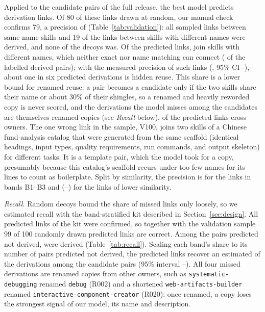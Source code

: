\documentclass[sigconf,screen]{acmart}
\begin{document}
Applied to the \ResCandPairs{} candidate pairs of the full release, the best model predicts \ResDerivedEdges{} derivation links. Of 80 of these links drawn at random, our manual check confirms 79, a precision of \ResValPrecision{} (Table~\ref{tab:validation}): all \ResValNSameName{} sampled links between same-name skills and 19 of the \ResValNDiffName{} links between skills with different names were derived, and none of the \ResValDecoys{} decoys was. Of the predicted links, \ResEdgesDiffName{} join skills with different names, which neither exact nor name matching can connect (\ResGoldDerivedDiffName{} of the labelled derived pairs); with the measured precision of such links (\ResValPrecDiffName{}, 95\% CI \ResValPrecDiffNameLo-\ResValPrecDiffNameHi), about one in six predicted derivations is hidden reuse. This share is a lower bound for renamed reuse: a pair becomes a candidate only if the two skills share their name or about 30\% of their shingles, so a renamed and heavily reworded copy is never scored, and the derivations the model misses among the candidates are themselves renamed copies (see \emph{Recall} below). \ResEdgesCrossOwner{} of the predicted links cross owners.
The one wrong link in the sample, V100, joins two skills of a Chinese fund-analysis catalog that were generated from the same scaffold (identical headings, input types, quality requirements, run commands, and output skeleton) for different tasks. It is a template pair, which the model took for a copy, presumably because this catalog's scaffold recurs under too few names for its lines to count as boilerplate. Split by similarity, the precision is \ResValPrecHiSim{} for the \ResValNHiSim{} links in bands B1--B3 and \ResValPrecLowSim{} (\ResValPrecLowSimLo--\ResValPrecLowSimHi) for the \ResValNLowSim{} links of lower similarity.

\emph{Recall.} Random decoys bound the share of missed links only loosely, so we estimated recall with the band-stratified kit described in Section~\ref{sec:design}. All \ResRCPos{} predicted links of the kit were confirmed, so together with the validation sample 99 of 100 randomly drawn predicted links are correct. Among the \ResRCNeg{} pairs predicted not derived, \ResRCNegDerived{} were derived (Table~\ref{tab:recall}). Scaling each band's share to its number of pairs predicted not derived, the predicted links recover an estimated \ResRCRecall{} of the derivations among the candidate pairs (95\% interval \ResRCRecallLo--\ResRCRecallHi). All four missed derivations are renamed copies from other owners, such as \texttt{systematic-debugging} renamed \texttt{debug} (R002) and a shortened \texttt{web-artifacts-builder} renamed \texttt{interactive-component-creator} (R020): once renamed, a copy loses the strongest signal of our model, its name and description.
 
\end{document}
